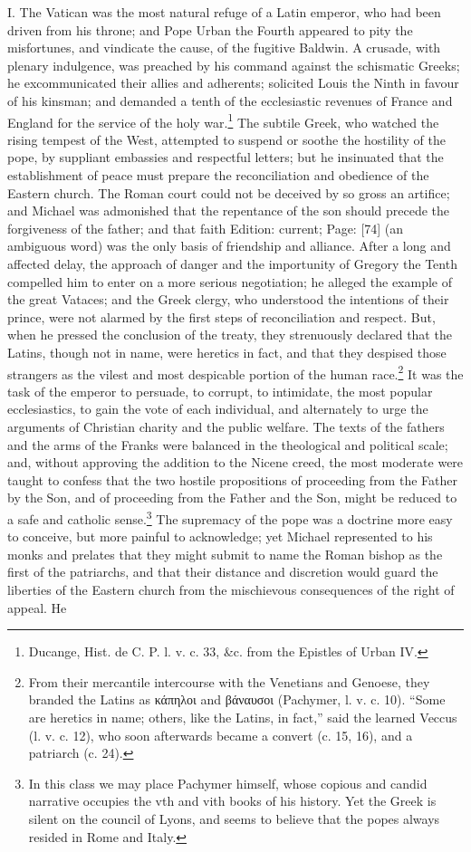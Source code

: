 I. The Vatican was the most natural refuge of a Latin emperor, who had been driven from his throne; and Pope Urban the Fourth appeared to pity the misfortunes, and vindicate the cause, of the fugitive Baldwin. A crusade, with plenary indulgence, was preached by his command against the schismatic Greeks; he excommunicated their allies and adherents; solicited Louis the Ninth in favour of his kinsman; and demanded a tenth of the ecclesiastic revenues of France and England for the service of the holy war.\footnote{Ducange, Hist. de C. P. l. v. c. 33, \&c. from the Epistles of Urban IV.} The subtile Greek, who watched the rising tempest of the West, attempted to suspend or soothe the hostility of the pope, by suppliant embassies and respectful letters; but he insinuated that the establishment of peace must prepare the reconciliation and obedience of the Eastern church. The Roman court could not be deceived by so gross an artifice; and Michael was admonished that the repentance of the son should precede the forgiveness of the father; and that faith Edition: current; Page: [74] (an ambiguous word) was the only basis of friendship and alliance. After a long and affected delay, the approach of danger and the importunity of Gregory the Tenth compelled him to enter on a more serious negotiation; he alleged the example of the great Vataces; and the Greek clergy, who understood the intentions of their prince, were not alarmed by the first steps of reconciliation and respect. But, when he pressed the conclusion of the treaty, they strenuously declared that the Latins, though not in name, were heretics in fact, and that they despised those strangers as the vilest and most despicable portion of the human race.\footnote{From their mercantile intercourse with the Venetians and Genoese, they branded the Latins as \textgreek{κάπηλοι} and \textgreek{βάναυσοι} (Pachymer, l. v. c. 10). \texthebrew{“}Some are heretics in name; others, like the Latins, in fact,\texthebrew{}” said the learned Veccus (l. v. c. 12), who soon afterwards became a convert (c. 15, 16), and a patriarch (c. 24).} It was the task of the emperor to persuade, to corrupt, to intimidate, the most popular ecclesiastics, to gain the vote of each individual, and alternately to urge the arguments of Christian charity and the public welfare. The texts of the fathers and the arms of the Franks were balanced in the theological and political scale; and, without approving the addition to the Nicene creed, the most moderate were taught to confess that the two hostile propositions of proceeding from the Father by the Son, and of proceeding from the Father and the Son, might be reduced to a safe and catholic sense.\footnote{In this class we may place Pachymer himself, whose copious and candid narrative occupies the vth and vith books of his history. Yet the Greek is silent on the council of Lyons, and seems to believe that the popes always resided in Rome and Italy.} The supremacy of the pope was a doctrine more easy to conceive, but more painful to acknowledge; yet Michael represented to his monks and prelates that they might submit to name the Roman bishop as the first of the patriarchs, and that their distance and discretion would guard the liberties of the Eastern church from the mischievous consequences of the right of appeal. He 
